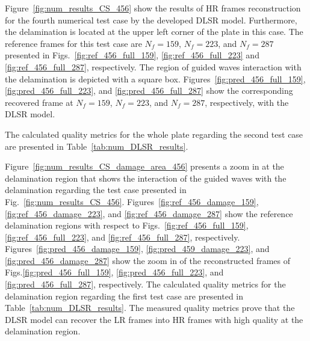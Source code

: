 Figure~\ref{fig:num_results_CS_456} show the results of HR frames reconstruction for the fourth numerical test case by the developed DLSR model.
Furthermore, the delamination is located at the upper left corner of the plate in this case.
The reference frames for this test case are $N_f=159$, $N_f=223$, and $N_f=287$ presented in Figs.~\ref{fig:ref_456_full_159}, \ref{fig:ref_456_full_223} and \ref{fig:ref_456_full_287}, respectively.
The region of guided waves interaction with the delamination is depicted with a square box.
Figures~\ref{fig:pred_456_full_159}, \ref{fig:pred_456_full_223}, and \ref{fig:pred_456_full_287} show the corresponding recovered frame at $N_f=159$, $N_f=223$, and $N_f=287$, respectively, with the DLSR model.

The calculated quality metrics for the whole plate regarding the second test case are presented in Table~\ref{tab:num_DLSR_results}.

Figure~\ref{fig:num_results_CS_damage_area_456} presents a zoom in at the delamination region that shows the interaction of the guided waves with the delamination regarding the test case presented in Fig.~\ref{fig:num_results_CS_456}.
Figures~\ref{fig:ref_456_damage_159}, \ref{fig:ref_456_damage_223}, and \ref{fig:ref_456_damage_287} show the reference delamination regions with respect to Figs.~\ref{fig:ref_456_full_159}, \ref{fig:ref_456_full_223}, and \ref{fig:ref_456_full_287}, respectively.
Figures~\ref{fig:pred_456_damage_159}, \ref{fig:pred_459_damage_223}, and \ref{fig:pred_456_damage_287} show the zoom in of the reconstructed frames of Figs.\ref{fig:pred_456_full_159}, \ref{fig:pred_456_full_223}, and \ref{fig:pred_456_full_287}, respectively.
The calculated quality metrics for the delamination region regarding the first test case are presented in Table~\ref{tab:num_DLSR_results}.
The measured quality metrics prove that the DLSR model can recover the LR frames into HR frames with high quality at the delamination region.

